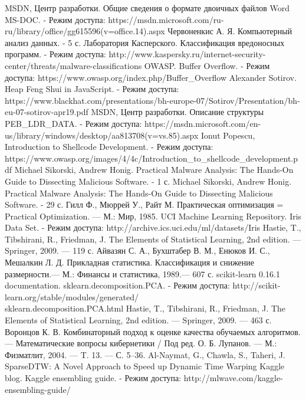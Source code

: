\begin{thebibliography}{99}
 MSDN, Центр разработки. Общие сведения о формате двоичных файлов Word MS-DOC. - Режим доступа: https://msdn.microsoft.com/ru-ru/library/office/gg615596(v=office.14).aspx
 Червоненкис А. Я. Компьютерный анализ данных. - 5 с.
 Лаборатория Касперского. Классификация вредоносных программ. - Режим доступа: http://www.kaspersky.ru/internet-security-center/threats/malware-classifications
 OWASP. Buffer Overflow. - Режим доступа: https://www.owasp.org/index.php/Buffer\_Overflow
 Alexander Sotirov. Heap Feng Shui in JavaScript. - Режим доступа: https://www.blackhat.com/presentations/bh-europe-07/Sotirov/Presentation/bh-eu-07-sotirov-apr19.pdf
 MSDN, Центр разработки. Описание структуры PEB\_LDR\_DATA. - Режим доступа: https://msdn.microsoft.com/en-us/library/windows/desktop/aa813708(v=vs.85).aspx
 Ionut Popescu, Introduction to Shellcode Development. - Режим доступа: https://www.owasp.org/images/4/4c/Introduction\_to\_shellcode\_development.pdf
 Michael Sikorski, Andrew Honig. Practical Malware Analysis: The Hands-On Guide to Dissecting Malicious Software. - 1 с.
 Michael Sikorski, Andrew Honig. Practical Malware Analysis: The Hands-On Guide to Dissecting Malicious Software. - 29 с.
 Гилл Ф., Мюррей У., Райт М. Практическая оптимизация = Practical Optimization. — М.: Мир, 1985.
 UCI Machine Learning Repository. Iris Data Set. - Режим доступа: http://archive.ics.uci.edu/ml/datasets/Iris
 Hastie, T., Tibshirani, R., Friedman, J. The Elements of Statistical Learning, 2nd edition. — Springer, 2009. — 119 с.
 Айвазян С. А., Бухштабер В. М., Енюков И. С., Мешалкин Л. Д. Прикладная статистика. Классификация и снижение размерности.— М.: Финансы и статистика, 1989.— 607 с.
 scikit-learn 0.16.1 documentation. sklearn.decomposition.PCA. - Режим доступа: http://scikit-learn.org/stable/modules/generated/\\sklearn.decomposition.PCA.html
 Hastie, T., Tibshirani, R., Friedman, J. The Elements of Statistical Learning, 2nd edition. — Springer, 2009. — 463 с.
 Воронцов К. В. Комбинаторный подход к оценке качества обучаемых алгоритмов. — Математические вопросы кибернетики / Под ред. О. Б. Лупанов. — М.: Физматлит, 2004. — T. 13. — С. 5–36.
 Al-Naymat, G., Chawla, S., Taheri, J. SparseDTW: A Novel Approach to Speed up Dynamic Time Warping
 Kaggle blog. Kaggle ensembling guide. - Режим доступа: http://mlwave.com/kaggle-ensembling-guide/
\end{thebibliography}